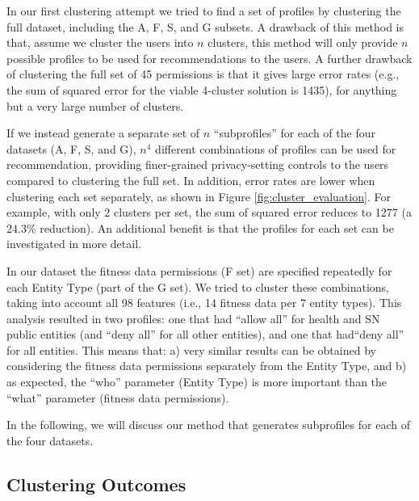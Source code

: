 In our first clustering attempt we tried to find a set of profiles by clustering the full dataset, including the A, F, S, and G subsets.
A drawback of this method is that, assume we cluster the users into $n$ clusters, this  method will  only provide $n$ possible profiles to be used for recommendations to the users. A further drawback of clustering the full set of 45 permissions is that it gives  large error rates (e.g., the sum of squared error for the viable 4-cluster solution is 1435),
for anything but a very large number of clusters. 

If we instead generate a separate set of $n$ ``subprofiles'' for each of the four datasets (A, F, S, and G), $n^4$  different combinations of profiles can be used for recommendation, providing finer-grained privacy-setting controls to the users compared to clustering the full set. In addition, error rates are lower when clustering each set separately, as shown in Figure \ref{fig:cluster_evaluation}. For example, with only 2 clusters per set, the sum of squared error reduces to 1277 (a 24.3\% reduction). %
An additional benefit is that the profiles for each set can be investigated in more detail. 


In our dataset the fitness data permissions (F set) are specified repeatedly for each Entity Type (part of the G set). We tried to cluster these combinations, taking into account all 98 features (i.e., 14 fitness data per 7 entity types). This analysis resulted in two profiles: one that had ``allow all'' for health and SN public entities (and ``deny all'' for all other entities), and one that had``deny all'' for all entities. This means that: a) very similar results can be obtained by considering the fitness data permissions separately from the Entity Type, and b) as expected, the ``who'' parameter (Entity Type) is more important than the ``what'' parameter (fitness data permissions). 

In the following, we will discuss our method that generates subprofiles for each of the four datasets.


\subsection{Clustering Outcomes}

